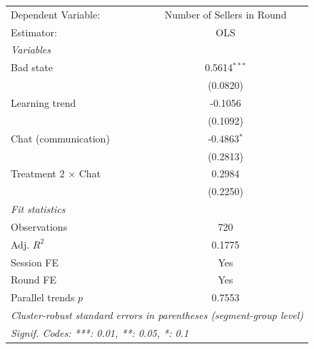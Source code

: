 
\begingroup
\centering
\scriptsize
\begin{tabular}{lc}
   \tabularnewline \midrule \midrule
   Dependent Variable: & Number of Sellers in Round\\
   Estimator:           & OLS\\
   \midrule
   \emph{Variables}\\
   Bad state                           & 0.5614$^{***}$\\
                                       & (0.0820)\\
   Learning trend                      & -0.1056\\
                                       & (0.1092)\\
   Chat (communication)                & -0.4863$^{*}$\\
                                       & (0.2813)\\
   Treatment 2 $\times$ Chat           & 0.2984\\
                                       & (0.2250)\\
   \midrule
   \emph{Fit statistics}\\
   Observations                        & 720\\
   Adj. $R^{2}$                        & 0.1775\\
   Session FE                          & Yes\\
   Round FE                            & Yes\\
   Parallel trends $p$                 & 0.7553\\
   \midrule \midrule
   \multicolumn{2}{l}{\emph{Cluster-robust standard errors in parentheses (segment-group level)}}\\
   \multicolumn{2}{l}{\emph{Signif. Codes: ***: 0.01, **: 0.05, *: 0.1}}\\
\end{tabular}
\par\endgroup


